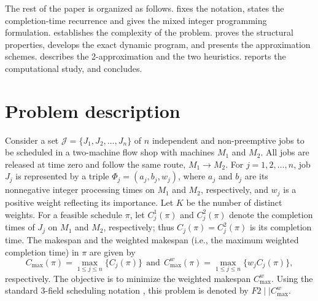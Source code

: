 ﻿\documentclass[12pt]{article} \textheight=24.5cm \textwidth=16.5cm \parskip = 0.165cm
\let\origsection\section
\renewcommand{\section}{\FloatBarrier\origsection}
\begin{document}
\begin{sloppypar}
        The rest of the paper is organized as follows.
         fixes the notation, states the completion-time recurrence and gives the mixed integer programming formulation.
         establishes the complexity of the problem.
         proves the structural properties, develops the exact dynamic program, and presents the approximation schemes.
         describes the 2-approximation and the two heuristics.
         reports the computational study, and  concludes.

        \section{Problem description} \label{sec:preliminaries}

        Consider a set $\mathcal{J} = \{J_1, J_2, \dots, J_n\}$ of $n$ independent and non-preemptive jobs to be scheduled in a two-machine flow shop with machines $M_1$ and $M_2$.
        All jobs are released at time zero and follow the same route, $M_1 \to M_2$.
        For $j=1, 2, \ldots, n$, job $J_j$ is represented by a triple $\Phi_j=(a_j, b_j, w_j)$, where $a_j$ and $b_j$ are its nonnegative integer processing times on $M_1$ and $M_2$, respectively, and $w_j$ is a positive weight reflecting its importance.
        Let $K$ be the number of distinct weights.
        For a feasible schedule $\pi$, let $C_j^1(\pi)$ and $C_j^2(\pi)$ denote the completion times of $J_j$ on $M_1$ and $M_2$, respectively; thus $C_j(\pi)=C_j^2(\pi)$ is its completion time.
        The makespan and the weighted makespan (i.e., the maximum weighted completion time) in $\pi$ are given by
        \begin{equation*}
            C_{\max}(\pi)=\max_{1 \leq j \leq n} \{C_j(\pi)\} ~~ \mathrm{and} ~~ C_{\max}^w(\pi)=\max_{1 \leq j \leq n} \{w_j C_j(\pi)\},
        \end{equation*}
        respectively.
        The objective is to minimize the weighted makespan $C_{\max}^w$.
        Using the standard 3-field scheduling notation \citep{Pinedo2022scheduling}, this problem is denoted by $F2 \mid \mid C_{\max}^w$.


\end{sloppypar}
\end{document}
